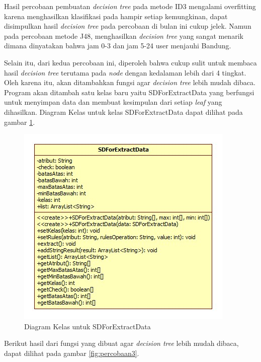 Hasil percobaan pembuatan \textsl{decision tree} pada metode ID3 mengalami overfitting karena menghasilkan klasifikasi pada hampir setiap kemungkinan, dapat disimpulkan hasil \textsl{decision tree} pada percobaan di bulan ini cukup jelek. Namun pada percobaan metode J48, menghasilkan \textsl{decision tree} yang sangat menarik dimana dinyatakan bahwa jam 0-3 dan jam 5-24 user menjauhi Bandung.

Selain itu, dari kedua percobaan ini, diperoleh bahwa cukup sulit untuk membaca hasil \textsl{decision tree} terutama pada \textsl{node} dengan kedalaman lebih dari 4 tingkat. Oleh karena itu, akan ditambahkan fungsi agar \textsl{decision tree} lebih mudah dibaca. Program akan ditambah satu kelas baru yaitu SDForExtractData yang berfungsi untuk menyimpan data dan membuat kesimpulan dari setiap \textsl{leaf} yang dihasilkan. Diagram Kelas untuk kelas SDForExtractData dapat dilihat pada gambar \ref{fig:classDiagramSDForExtractData}. 

\begin{figure}[H]
\centering
\includegraphics[scale=0.7]{Gambar/SDForExtractData.jpg}
\caption[Diagram Kelas untuk SDForExtractData]{Diagram Kelas untuk SDForExtractData} 
\label{fig:classDiagramSDForExtractData}
\end{figure}

Berikut hasil dari fungsi yang dibuat agar \textsl{decision tree} lebih mudah dibaca, dapat dilihat pada gambar \ref{fig:percobaan3}.

